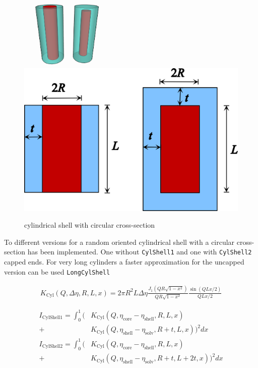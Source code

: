 \begin{figure}[htb]
\begin{center}
\includegraphics[width=0.4\textwidth]{../images/form_factor/cylindrical_obj/CylShell.png}
\hspace{0.1\textwidth}
\includegraphics[width=.4\textwidth]{../images/form_factor/cylindrical_obj/cylshell2D.png}
\end{center}
\caption{cylindrical shell with circular cross-section}
\label{cylshell}
\end{figure}

To different versions for a random oriented cylindrical shell with a
circular cross-section has been implemented. One without  \texttt{CylShell1}
and one with \texttt{CylShell2} capped ends. For very long cylinders a faster
approximation for the uncapped version can be used \texttt{LongCylShell}

\begin{align}
K_\text{Cyl}(Q,\Delta\eta,R,L,x) =
2 \pi R^2 L \Delta \eta
    \frac{J_1\left(Q R \sqrt{1-x^2}\right)}{Q R \sqrt{1-x^2}}
    \frac{\sin(Q L x/2)}{QL x/2}
\end{align}

\begin{align}
I_\text{CylShell1} =
\int_0^1 \biggl(
  &
  K_\text{Cyl}\left(Q,\eta_\text{core}-\eta_\text{shell},R,L,x\right) \\
+&  K_\text{Cyl}\left(Q,\eta_\text{shell}-\eta_\text{solv},R+t,L,x\right)
\biggr)^2 dx \nonumber \\
I_\text{CylShell2} =
\int_0^1 \biggl(
 &  K_\text{Cyl}\left(Q,\eta_\text{core}-\eta_\text{shell},R,L,x\right) \\
+&  K_\text{Cyl}\left(Q,\eta_\text{shell}-\eta_\text{solv},R+t,L+2t,x\right)
\biggr)^2 dx \nonumber
\end{align}

